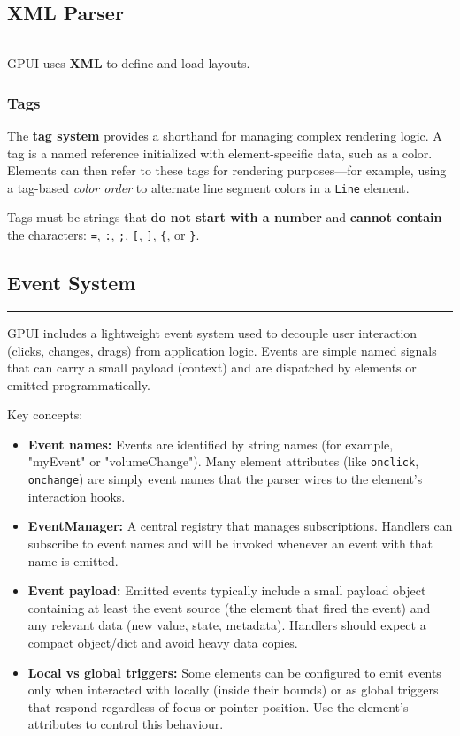 \documentclass[a4paper,11pt]{article}
\begin{document}
\subsection*{XML Parser}
\vspace{-1.2em}
\rule{\linewidth}{0.4pt}
GPUI uses \textbf{XML} to define and load layouts.

\hypertarget{tag}{}
\subsubsection*{Tags}

The \textbf{tag system} provides a shorthand for managing complex rendering logic. A tag is a named reference initialized with element-specific data, such as a color. Elements can then refer to these tags for rendering purposes—for example, using a tag-based \textit{color order} to alternate line segment colors in a \texttt{Line} element.

Tags must be strings that \textbf{do not start with a number} and \textbf{cannot contain} the characters: \texttt{=}, \texttt{:}, \texttt{;}, \texttt{[}, \texttt{]}, \texttt{\{}, or \texttt{\}}.

\subsection*{Event System}
\vspace{-1.2em}
\rule{\linewidth}{0.4pt}
GPUI includes a lightweight event system used to decouple user interaction (clicks, changes, drags) from application logic. Events are simple named signals that can carry a small payload (context) and are dispatched by elements or emitted programmatically.

Key concepts:
\begin{itemize}
    \item \textbf{Event names:} Events are identified by string names (for example, "myEvent" or "volumeChange"). Many element attributes (like \texttt{onclick}, \texttt{onchange}) are simply event names that the parser wires to the element's interaction hooks.
    \item \textbf{EventManager:} A central registry that manages subscriptions. Handlers can subscribe to event names and will be invoked whenever an event with that name is emitted.
    \item \textbf{Event payload:} Emitted events typically include a small payload object containing at least the event source (the element that fired the event) and any relevant data (new value, state, metadata). Handlers should expect a compact object/dict and avoid heavy data copies.
    \item \textbf{Local vs global triggers:} Some elements can be configured to emit events only when interacted with locally (inside their bounds) or as global triggers that respond regardless of focus or pointer position. Use the element's attributes to control this behaviour.
\end{itemize}
\end{document}
